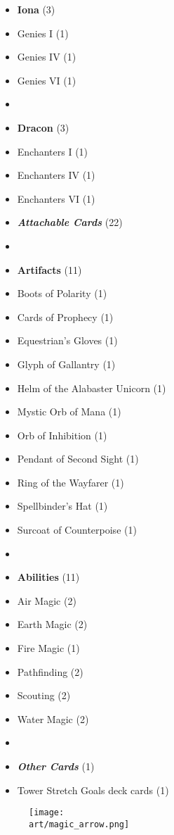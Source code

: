 \begin{multicols}{3}
\begin{itemize}[leftmargin=0pt, label={}, noitemsep]
  \item \textbf{Iona} (3)
  \item Genies I (1)
  \item Genies IV (1)
  \item Genies VI (1)
  \item
  \item \textbf{Dracon} (3)
  \item Enchanters I (1)
  \item Enchanters IV (1)
  \item Enchanters VI (1)
\columnbreak
  \item \textbf{\emph{Attachable Cards}} (22)
  \item
  \item \textbf{Artifacts} (11)
  \item Boots of Polarity (1)
  \item Cards of Prophecy (1)
  \item Equestrian's Gloves (1)
  \item Glyph of Gallantry (1)
  \item Helm of the Alabaster Unicorn (1)
  \item Mystic Orb of Mana (1)
  \item Orb of Inhibition (1)
  \item Pendant of Second Sight (1)
  \item Ring of the Wayfarer (1)
  \item Spellbinder's Hat (1)
  \item Surcoat of Counterpoise (1)
  \item
  \item \textbf{Abilities} (11)
  \item Air Magic (2)
  \item Earth Magic (2)
  \item Fire Magic (1)
  \item Pathfinding (2)
  \item Scouting (2)
  \item Water Magic (2)
  \item
  \item \textbf{\emph{Other Cards}} (1)
  \item Tower Stretch Goals deck cards (1)
\end{itemize}

\end{multicols}

\vfill
\begin{figure*}[!hb]
  \centering
  \texttt{[image: \\art/magic\_arrow.png]}
\end{figure*}
\vfill
